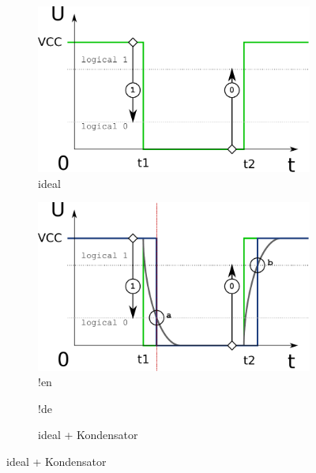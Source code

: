 \begin{figure}%
  \begin{subfigure}[htbp]{0.485\textwidth}
    \centering
    \includegraphics[width=\textwidth]{LED/S005_stable-decisions_ideal_signal.pdf}
    \caption{ideal}
    \label{S005SignalDiagam-Ideal}
  \end{subfigure}
  \quad
  \begin{subfigure}[htbp]{0.485\textwidth}
    \centering
    \includegraphics[width=\textwidth]{LED/S005_stable-decisions_ideal_signal+C.pdf}
!en     \caption{ideal + Capacitor}
!de     \caption{ideal + Kondensator}
    \label{S005SignalDiagam-Ideal+C}
  \end{subfigure}


\end{figure}
